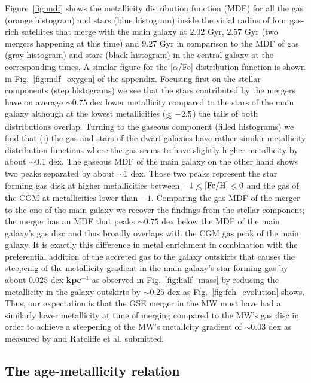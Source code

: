 \documentclass[useAMS,usenatbib]{mnras}
\def\lesssim{\mathrel{\hbox{\rlap{\hbox{\lower4pt\hbox{$\sim$}}}\hbox{$<$}}}}
\begin{document}
 Figure~\ref{fig:mdf} shows the metallicity distribution function (MDF) for all the gas (orange histogram) and stars (blue histogram) inside the virial radius of four gas-rich satellites that merge with the main galaxy at $2.02$ Gyr, $2.57$ Gyr (two mergers happening at this time) and $9.27$ Gyr in comparison to the MDF of gas (gray histogram) and stars (black histogram) in the central galaxy at the corresponding times. A similar figure for the [$\alpha$/Fe] distribution function is shown in Fig.~\ref{fig:mdf_oxygen} of the appendix. Focusing first on the stellar components (step histograms) we see that the stars contributed by the mergers have on average $\sim0.75$ dex lower metallicity compared to the stars of the main galaxy although at the lowest metallicities ($\lesssim-2.5$) the tails of both distributions overlap. Turning to the gaseous component (filled histograms) we find that (i) the gas and stars of the dwarf galaxies have rather similar metallicity distribution functions where the gas seems to have slightly higher metallicity by about $\sim0.1$ dex. The gaseous MDF of the main galaxy on the other hand shows two peaks separated by about $\sim1$ dex. Those two peaks represent the star forming gas disk at higher metallicities between $-1\lesssim \rm{[Fe/H]}\lesssim0$ and the gas of the CGM at metallicities lower than $-1$. Comparing the gas MDF of the merger to the one of the main galaxy we recover the findings from the stellar component; the merger has an MDF that peaks $\sim0.75$ dex below the MDF of the main galaxy's gas disc and thus broadly overlaps with the CGM gas peak of the main galaxy. It is exactly this difference in metal enrichment in combination with the preferential addition of the accreted gas to the galaxy outskirts that causes the steepenig of the metallicity gradient in the main galaxy's star forming gas by about $0.025$ dex \textbf{kpc$^{-1}$} as observed in Fig.~\ref{fig:half_mass} by reducing the metallicity in the galaxy outskirts by $\sim0.25$ dex as Fig.~\ref{fig:feh_evolution} shows. Thus, our expectation is that the GSE merger in the MW must have had a similarly lower metallicity at time of merging compared to the MW's gas disc in order to achieve a steepening of the MW's metallcity gradient of $\sim0.03$ dex as measured by \cite{Lu2022b} and Ratcliffe et al. submitted.


\subsection{The age-metallicity relation}
\label{sec:age_fe}
\end{document}
